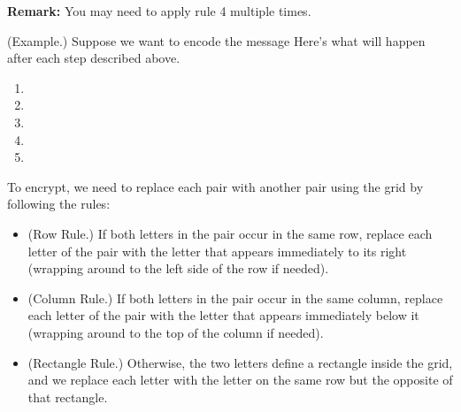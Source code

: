 \documentclass[letterpaper]{article}
\begin{document}
\textbf{Remark:} You may need to apply rule 4 multiple times. 

\begin{mdframed}
    (Example.) Suppose we want to encode the message  Here's what will happen after each step described above. 
    \begin{enumerate}
        \item {}
        \item {}
        \item {}
        \item {}
        \item {}
    \end{enumerate}
\end{mdframed}

To encrypt, we need to replace each pair with another pair using the grid by following the rules: 
\begin{itemize}
    \item (Row Rule.) If both letters in the pair occur in the same row, replace each letter of the pair with the letter that appears immediately to its right (wrapping around to the left side of the row if needed).
    \item (Column Rule.) If both letters in the pair occur in the same column, replace each letter of the pair with the letter that appears immediately below it (wrapping around to the top of the column if needed).
    \item (Rectangle Rule.) Otherwise, the two letters define a rectangle inside the grid, and we replace each letter with the letter on the same row but the opposite of that rectangle.
\end{itemize}
\end{document}
